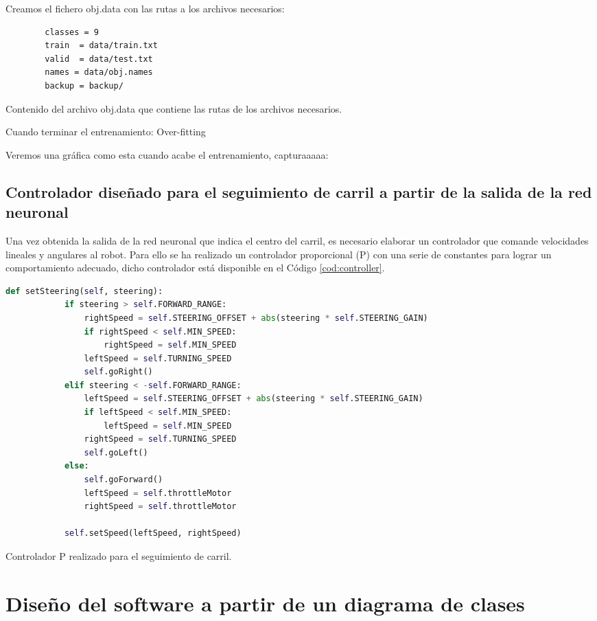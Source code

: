 Creamos el fichero obj.data con las rutas a los archivos necesarios:

\begin{code}[h]
	\begin{lstlisting}
		classes = 9
		train  = data/train.txt
		valid  = data/test.txt
		names = data/obj.names
		backup = backup/
	\end{lstlisting}
	\caption[Contenido del archivo obj.data que contiene las rutas de los archivos necesarios.]{Contenido del archivo obj.data que contiene las rutas de los archivos
		necesarios.}
	\label{cod:objdata}
\end{code}

Cuando terminar el entrenamiento: Over-fitting

Veremos una gráfica como esta cuando acabe el entrenamiento, capturaaaaa:


\subsection{Controlador diseñado para el seguimiento de carril a partir de la salida de la red neuronal}
Una vez obtenida la salida de la red neuronal que indica el centro del carril, es necesario elaborar un controlador que comande velocidades lineales y angulares al robot. Para ello se ha realizado un controlador proporcional (P) con una serie de constantes para lograr un comportamiento adecuado, dicho controlador está disponible en el Código \ref{cod:controller}.\\ 

\begin{code}[h]
	\begin{lstlisting}[language=Python]
		def setSteering(self, steering):
			if steering > self.FORWARD_RANGE:
				rightSpeed = self.STEERING_OFFSET + abs(steering * self.STEERING_GAIN)
				if rightSpeed < self.MIN_SPEED:
					rightSpeed = self.MIN_SPEED
				leftSpeed = self.TURNING_SPEED
				self.goRight()
			elif steering < -self.FORWARD_RANGE:
				leftSpeed = self.STEERING_OFFSET + abs(steering * self.STEERING_GAIN)
				if leftSpeed < self.MIN_SPEED:
					leftSpeed = self.MIN_SPEED
				rightSpeed = self.TURNING_SPEED
				self.goLeft()
			else:
				self.goForward()
				leftSpeed = self.throttleMotor
				rightSpeed = self.throttleMotor
			
			self.setSpeed(leftSpeed, rightSpeed)
	\end{lstlisting}
	\caption[Controlador P realizado para el seguimiento de carril.]{Controlador P realizado para el seguimiento de carril.}
	\label{cod:controller}
\end{code}

\section{Diseño del software a partir de un diagrama de clases}

